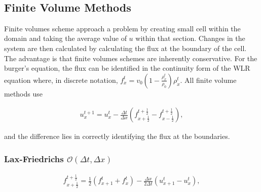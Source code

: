 \documentclass[11pt]{article}
\begin{document}
    \begin{center}
    \end{center}
    { \hspace*{\fill} \\}
    
    \subsection{Finite Volume Methods}\label{finite-volume-methods}

Finite volumes scheme approach a problem by creating small cell within
the domain and taking the average value of \(u\) within that section.
Changes in the system are then calculated by calculating the flux at the
boundary of the cell. The advantage is that finite volumes schemes are
inherently conservative. For the burger's equation, the flux can be
identified in the continuity form of the WLR equation where, in discrete
notation,
\(f_x^t = v_0 \left(1-\frac{\rho_x^t}{\rho_0}\right)\rho_x^t\). All
finite volume methods use

\begin{align}
    u_x^{t+1} = u_x^t -\frac{\Delta t}{\Delta x}\left(f_{x+\frac{1}{2}}^{t+\frac{1}{2}} - f_{x-\frac{1}{2}}^{t+\frac{1}{2}}\right),
\end{align}

and the difference lies in correctly identifying the flux at the
boundaries.

    \subsubsection{\texorpdfstring{Lax-Friedrichs
\(\mathcal{O}(\Delta t, \Delta x)\)}{Lax-Friedrichs \textbackslash{}mathcal\{O\}(\textbackslash{}Delta t, \textbackslash{}Delta x)}}\label{lax-friedrichs-mathcalodelta-t-delta-x}

\begin{align}
    f_{x+\frac{1}{2}}^{t+\frac{1}{2}} = \frac{1}{2}(f_{x+1}^t + f_x^t) - \frac{\Delta x}{2\Delta t}(u_{x+1}^t - u_x^t), 
\end{align}
\end{document}
